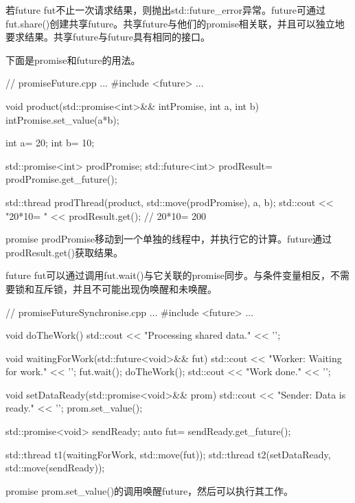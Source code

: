 若future fut不止一次请求结果，则抛出std::future\_error异常。future可通过fut.share()创建共享future。共享future与他们的promise相关联，并且可以独立地要求结果。共享future与future具有相同的接口。

下面是promise和future的用法。


\begin{cpp}
// promiseFuture.cpp
...
#include <future>
...

void product(std::promise<int>&& intPromise, int a, int b){
	intPromise.set_value(a*b);
}

int a= 20;
int b= 10;

std::promise<int> prodPromise;
std::future<int> prodResult= prodPromise.get_future();

std::thread prodThread(product, std::move(prodPromise), a, b);
std::cout << "20*10= " << prodResult.get(); // 20*10= 200
\end{cpp}

promise prodPromise移动到一个单独的线程中，并执行它的计算。future通过prodResult.get()获取结果。


future fut可以通过调用fut.wait()与它关联的promise同步。与条件变量相反，不需要锁和互斥锁，并且不可能出现伪唤醒和未唤醒。


\begin{cpp}
// promiseFutureSynchronise.cpp
...
#include <future>
...

void doTheWork(){
	std::cout << "Processing shared data." << '\n';
}

void waitingForWork(std::future<void>&& fut){
	std::cout << "Worker: Waiting for work." <<
	'\n';
	fut.wait();
	doTheWork();
	std::cout << "Work done." << '\n';
}

void setDataReady(std::promise<void>&& prom){
	std::cout << "Sender: Data is ready." <<
	'\n';
	prom.set_value();
}

std::promise<void> sendReady;
auto fut= sendReady.get_future();

std::thread t1(waitingForWork, std::move(fut));
std::thread t2(setDataReady, std::move(sendReady));
\end{cpp}

promise prom.set\_value()的调用唤醒future，然后可以执行其工作。














